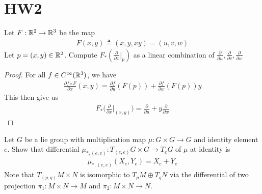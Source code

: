 \documentclass{report}
\begin{document}
\section{HW2}
\begin{question}{}{}
Let $F:\mathbb{R}^2 \rightarrow \mathbb{R}^3$ be the map 
\begin{align*}
F(x,y)\triangleq (x,y,xy)=(u,v,w)
\end{align*}
Let $p=(x,y)\in\mathbb{R}^2$. Compute $F_*(\frac{\partial }{\partial x}|_p)$ as a linear combination of $\frac{\partial}{\partial u},\frac{\partial }{\partial v},\frac{\partial }{\partial w}$
\end{question}
\begin{proof}
For all $f\in C^{\infty}(\mathbb{R}^3)$, we have 
\begin{align*}
\frac{\partial f\circ F}{\partial x}(x,y)= \frac{\partial f}{\partial u}( F(p)) + \frac{\partial f}{\partial w}(F(p))y
\end{align*}
This then give us 
\begin{align*}
F_*\Big(\frac{\partial }{\partial x}\Big|_{(x,y)}\Big)= \frac{\partial }{\partial u}+ y\frac{\partial }{\partial w}
\end{align*}
\end{proof}
\begin{question}{}{}
  Let $G$ be a lie group with multiplication map $\mu :G \times G\rightarrow G$ and identity element $e$. Show that differential  $\mu_{*,(e,e)}:T_{(e,e)}G\times G\rightarrow T_eG$ of $\mu$ at identity is 
\begin{align*}
  \mu_{*,(e,e)}(X_e,Y_e)=X_e+Y_e
\end{align*}
  Note that $T_{(p,q)}M\times N$ is isomorphic to $T_pM\oplus T_qN$ via the differential of two projection  $\pi_1:M\times N\rightarrow M$ and $\pi_2:M\times N\rightarrow N$. 
\end{question}
\end{document}
